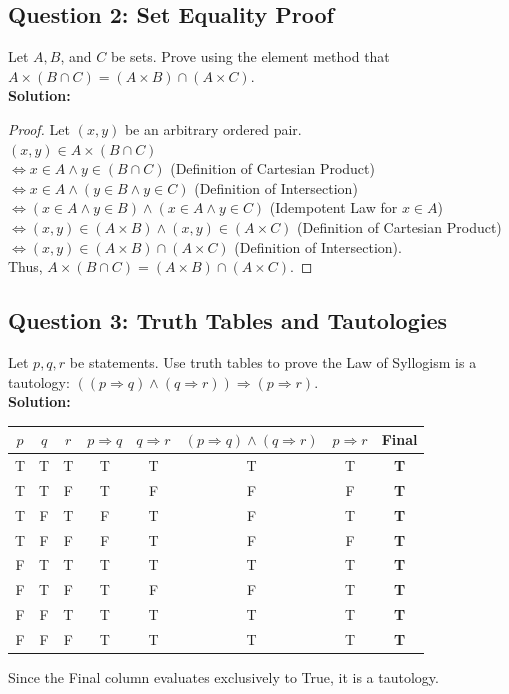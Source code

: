 \documentclass[11pt]{article}
\begin{document}
\subsection*{Question 2: Set Equality Proof}
Let $A, B$, and $C$ be sets. Prove using the element method that $A \times (B \cap C) = (A \times B) \cap (A \times C)$.\\
\textbf{Solution:}
\begin{proof}
Let $(x,y)$ be an arbitrary ordered pair. \\
$(x,y) \in A \times (B \cap C)$ \\
$\Leftrightarrow x \in A \wedge y \in (B \cap C)$ (Definition of Cartesian Product) \\
$\Leftrightarrow x \in A \wedge (y \in B \wedge y \in C)$ (Definition of Intersection) \\
$\Leftrightarrow (x \in A \wedge y \in B) \wedge (x \in A \wedge y \in C)$ (Idempotent Law for $x \in A$) \\
$\Leftrightarrow (x,y) \in (A \times B) \wedge (x,y) \in (A \times C)$ (Definition of Cartesian Product) \\
$\Leftrightarrow (x,y) \in (A \times B) \cap (A \times C)$ (Definition of Intersection). \\
Thus, $A \times (B \cap C) = (A \times B) \cap (A \times C)$.
\end{proof}

\subsection*{Question 3: Truth Tables and Tautologies}
Let $p, q, r$ be statements. Use truth tables to prove the Law of Syllogism is a tautology: $((p \Rightarrow q) \wedge (q \Rightarrow r)) \Rightarrow (p \Rightarrow r)$.\\
\textbf{Solution:}
\begin{center}
\begin{tabular}{|c|c|c|c|c|c|c|c|}
\hline
$p$ & $q$ & $r$ & $p \Rightarrow q$ & $q \Rightarrow r$ & $(p \Rightarrow q) \wedge (q \Rightarrow r)$ & $p \Rightarrow r$ & Final \\
\hline
T & T & T & T & T & T & T & \textbf{T} \\
T & T & F & T & F & F & F & \textbf{T} \\
T & F & T & F & T & F & T & \textbf{T} \\
T & F & F & F & T & F & F & \textbf{T} \\
F & T & T & T & T & T & T & \textbf{T} \\
F & T & F & T & F & F & T & \textbf{T} \\
F & F & T & T & T & T & T & \textbf{T} \\
F & F & F & T & T & T & T & \textbf{T} \\
\hline
\end{tabular}
\end{center}
Since the Final column evaluates exclusively to True, it is a tautology.
\end{document}
